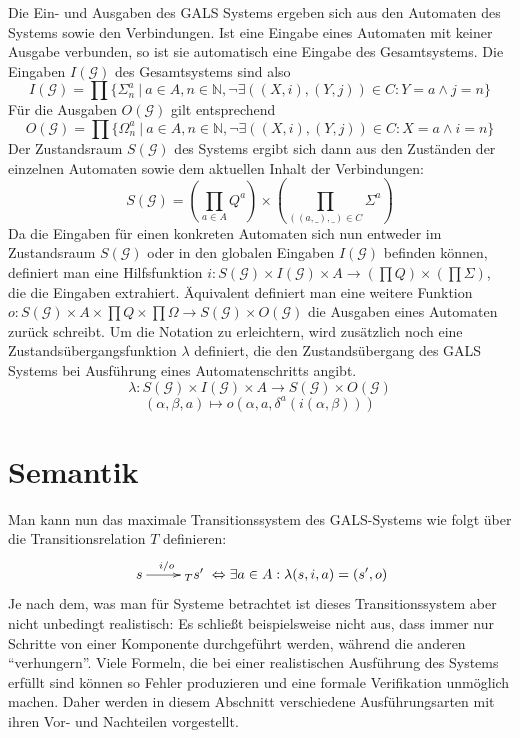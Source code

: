 Die Ein- und Ausgaben des GALS Systems ergeben sich aus den Automaten des Systems sowie den Verbindungen.
Ist eine Eingabe eines Automaten mit keiner Ausgabe verbunden, so ist sie automatisch eine Eingabe des Gesamtsystems.
Die Eingaben $I(\mathcal{G})$ des Gesamtsystems sind also
\[ I(\mathcal{G}) = \prod \{ \Sigma^a_n\ |\ a\in A, n\in \mathbb{N}, \lnot\exists ((X,i),(Y,j))\in C: Y=a\land j=n \} \]
Für die Ausgaben $O(\mathcal{G})$ gilt entsprechend
\[ O(\mathcal{G}) = \prod \{ \Omega^a_n\ |\ a\in A, n\in \mathbb{N}, \lnot\exists ((X,i),(Y,j))\in C: X=a\land i=n \} \]
Der Zustandsraum $S(\mathcal{G})$ des Systems ergibt sich dann aus den Zuständen der einzelnen Automaten sowie dem aktuellen Inhalt der Verbindungen:
\[ S(\mathcal{G}) = \left(\prod_{a\in A} Q^a\right)\times\left(\prod_{((a,\_),\_)\in C} \Sigma^a\right) \]
Da die Eingaben für einen konkreten Automaten sich nun entweder im Zustandsraum $S(\mathcal{G})$ oder in den globalen Eingaben $I(\mathcal{G})$ befinden können, definiert man eine Hilfsfunktion $i : S(\mathcal{G})\times I(\mathcal{G})\times A\rightarrow (\prod Q)\times(\prod\Sigma)$, die die Eingaben extrahiert.
Äquivalent definiert man eine weitere Funktion $o : S(\mathcal{G})\times A\times\prod Q\times\prod\Omega\rightarrow S(\mathcal{G})\times O(\mathcal{G})$ die Ausgaben eines Automaten zurück schreibt.
Um die Notation zu erleichtern, wird zusätzlich noch eine Zustandsübergangsfunktion $\lambda$ definiert, die den Zustandsübergang des GALS Systems bei Ausführung eines Automatenschritts angibt.
\[ \lambda : S(\mathcal{G})\times I(\mathcal{G})\times A\rightarrow S(\mathcal{G})\times O(\mathcal{G}) \]
\[ (\alpha,\beta,a) \mapsto o(\alpha,a,\delta^a(i(\alpha,\beta))) \]

\section{Semantik}
Man kann nun das maximale Transitionssystem des GALS-Systems wie folgt über die Transitionsrelation $T$ definieren:
\[ \xymatrix { s \ar[r]^{i/o} & _T s' } \Leftrightarrow \exists a\in A: \lambda(s,i,a) = (s',o) \]
Je nach dem, was man für Systeme betrachtet ist dieses Transitionssystem aber nicht unbedingt realistisch:
Es schließt beispielsweise nicht aus, dass immer nur Schritte von einer Komponente durchgeführt werden, während die anderen "`verhungern"'.
Viele Formeln, die bei einer realistischen Ausführung des Systems erfüllt sind können so Fehler produzieren und eine formale Verifikation unmöglich machen.
Daher werden in diesem Abschnitt verschiedene Ausführungsarten mit ihren Vor- und Nachteilen vorgestellt.

